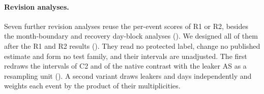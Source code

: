 
\paragraph{Revision analyses.}
Seven further revision analyses reuse the per-event scores of R1 or R2, besides the month-boundary and recovery day-block analyses ().
We designed all of them after the R1 and R2 results ().
They read no protected label, change no published estimate and form no test family, and their intervals are unadjusted.
The first redraws the intervals of C2 and of the native contrast with the leaker AS as a resampling unit ().
A second variant draws leakers and days independently and weights each event by the product of their multiplicities.

